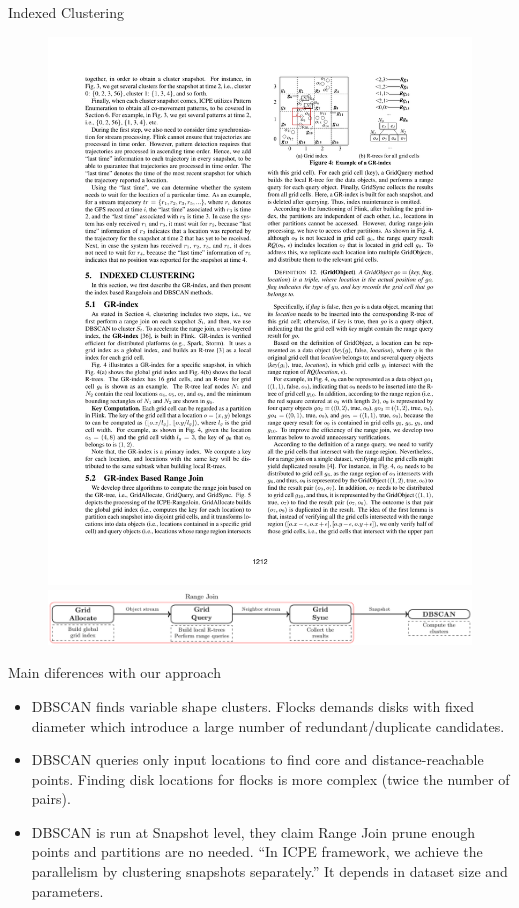 \documentclass{beamer}
\begin{document}
\begin{frame}{Indexed Clustering}
    \centering 
    \begin{figure}
        \includegraphics[trim=11cm 21.25cm 1.5cm 2cm, clip, width=.85\textwidth]{figures/Chen_p1212}
        \includegraphics[width=1\textwidth]{figures/RangeJoin}
    \end{figure}
\end{frame}

\begin{frame}{Main diferences with our approach}
    \begin{itemize}
        \item DBSCAN finds variable shape clusters. Flocks demands disks with fixed diameter which introduce a large number of redundant/duplicate candidates.
        \item DBSCAN queries only input locations to find core and distance-reachable points.  Finding disk locations for flocks is more complex (twice the number of pairs).
        \item DBSCAN is run at Snapshot level, they claim Range Join prune enough points and partitions are no needed. ``In ICPE framework, we achieve the parallelism by clustering snapshots separately.'' It depends in dataset size and parameters.
    \end{itemize}
\end{frame}
\end{document}
